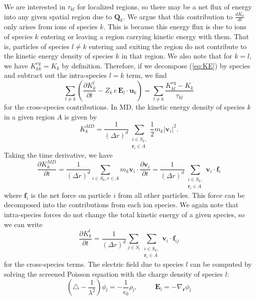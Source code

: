 \documentclass{article}
\begin{document}
We are interested in $\tau_{kl}$ for localized regions, so there may be a net flux of energy into any given spatial region due to $\mathbf{Q}_k$. We argue that this contribution to $\frac{dK_k}{dt}$ only arises from ions of species $k$. This is because this energy flux is due to ions of species $k$ entering or leaving a region carrying kinetic energy with them. That is, particles of species $l\neq k$ entering and exiting the region do not contribute to the kinetic energy density of species $k$ in that region. We also note that for $k=l$, we have $K_{kk}^{eq}=K_k$ by definition. Therefore, if we decompose (\ref{eq:KE}) by species and subtract out the intra-species $l=k$ term, we find
\begin{equation}
\sum_{l\neq k}\left(\frac{\partial K_k^l}{\partial t} - Z_k\,e\,\mathbf{E}_l\cdot\mathbf{u}_k\right) = \sum_{l\neq k}\frac{K_{kl}^{eq}-K_k}{\tau_{kl}}\label{eq:dKdt}
\end{equation}
for the cross-species contributions. In MD, the kinetic energy density of species $k$ in a given region $A$ is given by
\begin{equation*}
K^{MD}_k = \frac{1}{(\Delta r)^d}\sum_{\substack{i\in S_k,\\\mathbf{r}_i \in A}}\frac{1}{2}m_k|\mathbf{v}_i|^2.
\end{equation*}
Taking the time derivative, we have
\begin{equation*}
\frac{\partial K_k^{MD}}{\partial t} = \frac{1}{(\Delta r)^d}\sum_{i\in S_k,r \in A}m_k\mathbf{v}_i\cdot\frac{\partial \mathbf{v}_i}{\partial t} = \frac{1}{(\Delta r)^d}\sum_{\substack{i\in S_k,\\\mathbf{r}_i \in A}}\mathbf{v}_i\cdot\mathbf{f}_i
\end{equation*}
where $\mathbf{f}_i$ is the net force on particle $i$ from all other particles. This force can be decomposed into the contributions from each ion species. We again note that intra-species forces do not change the total kinetic energy of a given species, so we can write
\begin{equation}
\frac{\partial K_k^l}{\partial t} = \frac{1}{(\Delta r)^d}\sum_{j\in S_l}\sum_{\substack{i\in S_k,\\\mathbf{r}_i \in A}}\mathbf{v}_i\cdot\mathbf{f}_{ij}
\end{equation}
for the cross-species terms. The electric field due to species $l$ can be computed by solving the screened Poisson equation with the charge density of species $l$:
\[
 \left(\bigtriangleup -\frac{1}{\lambda^2}\right)\phi_l=-\frac{1}{\epsilon_0}\rho_l,\;\;\;\;\;\;\;\;\;\mathbf{E}_l=-\nabla_\mathbf{r}\phi_l
\]
\end{document}
